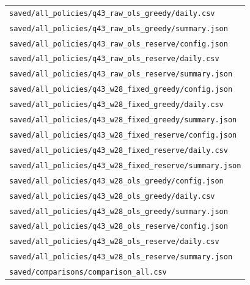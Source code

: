 \begin{longtable}{p{}}
\nolinkurl{saved/all_policies/q43_raw_ols_greedy/daily.csv} \\

\nolinkurl{saved/all_policies/q43_raw_ols_greedy/summary.json} \\

\nolinkurl{saved/all_policies/q43_raw_ols_reserve/config.json} \\

\nolinkurl{saved/all_policies/q43_raw_ols_reserve/daily.csv} \\

\nolinkurl{saved/all_policies/q43_raw_ols_reserve/summary.json} \\

\nolinkurl{saved/all_policies/q43_w28_fixed_greedy/config.json} \\

\nolinkurl{saved/all_policies/q43_w28_fixed_greedy/daily.csv} \\

\nolinkurl{saved/all_policies/q43_w28_fixed_greedy/summary.json} \\

\nolinkurl{saved/all_policies/q43_w28_fixed_reserve/config.json} \\

\nolinkurl{saved/all_policies/q43_w28_fixed_reserve/daily.csv} \\

\nolinkurl{saved/all_policies/q43_w28_fixed_reserve/summary.json} \\

\nolinkurl{saved/all_policies/q43_w28_ols_greedy/config.json} \\

\nolinkurl{saved/all_policies/q43_w28_ols_greedy/daily.csv} \\

\nolinkurl{saved/all_policies/q43_w28_ols_greedy/summary.json} \\

\nolinkurl{saved/all_policies/q43_w28_ols_reserve/config.json} \\

\nolinkurl{saved/all_policies/q43_w28_ols_reserve/daily.csv} \\

\nolinkurl{saved/all_policies/q43_w28_ols_reserve/summary.json} \\

\nolinkurl{saved/comparisons/comparison_all.csv} \\


\end{longtable}
